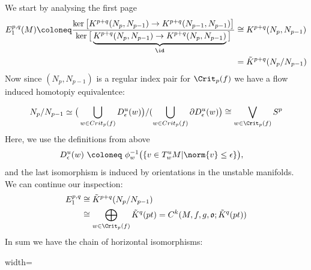 \begin{corollary}
	We start by analysing the first page
	\begin{align*}
		E^{p,q}_1(M)\coloneq\frac{\ker\big[K^{p+q}(N_{p},N_{p-1})\to K^{p+q}(N_{p-1},N_{p-1})  \big]}{\ker\big[\underbrace{K^{p+q}(N_{p},N_{p-1})\to K^{p+q}(N_{p},N_{p-1})}_{\id}\big]} &\cong K^{p+q}(N_{p},N_{p-1})\\
		&=\tilde{K}^{p+q}(N_p\slash N_{p-1})
	\end{align*}
	Now since $(N_p,N_{p-1})$ is a regular index pair for $\Crit_p(f)$ we have a flow induced homotopiy equivalentce:
	
	\begin{equation*}
		N_p\slash N_{p-1}
		\simeq          \big(\bigcup_{w\in Crit_p(f)}D^u_\epsilon(w)\big) \slash (\bigcup_{w\in Crit_p(f)} \partial D^u_\epsilon(w)\big)
		\cong           \bigvee_{w\in \Crit_p(f)}S^p
	\end{equation*} Here, we use the definitions from above
	\begin{align*}
		D^{u}_\epsilon (w)&~\coloneq~ \phi_w^{-1} \big(\{v\in T_w^{u }M | \norm{v}\leq \epsilon \} \big), 
	\end{align*}and the last isomorphism is induced by orientations in the unstable manifolds. We can continue our inspection:
	\begin{align*}
		E^{p,q}_1&\cong \tilde{K}^{p+q}(N_p\slash N_{p-1})\\
		&\cong \bigoplus_{w\in \Crit_p(f)}\tilde{K}^q(pt)=C^k(M,f,g,\mathfrak{o};\tilde{K}^q(pt))\\
	\end{align*} In sum we have the chain of horizontal isomorphisms: 
	\begin{fdiagram}\label{diag: first page comparison}
		\begin{adjustbox}{width=\textwidth}
		\end{adjustbox}
		

\end{fdiagram}
\end{corollary}

